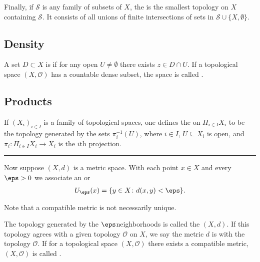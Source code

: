 \documentclass[letterpaper,10pt,english]{jupyterBook}
\begin{document}
\sphinxAtStartPar
Finally, if \(\mathcal{S}\) is any family of subsets of \(X\), the  is the smallest topology on \(X\) containing \(\mathcal{S}\). It consists of all unions of finite intersections of sets in \(\mathcal{S} \cup \{X,\emptyset\}\).


\subsection{Density}
\label{\detokenize{polish:density}}
\sphinxAtStartPar
A set \(D \subset X\) is  if for any open \(U \neq \emptyset\) there exists \(z \in D \cap U\). If a topological space \((X, \mathcal{O})\) has a countable dense subset, the space is called .


\subsection{Products}
\label{\detokenize{polish:products}}
\sphinxAtStartPar
If \((X_i)_{i \in I}\) is a family of topological spaces, one defines the  on \(\Pi_{i \in I} X_i\) to be the topology generated by the sets \(\pi_i^{-1}(U)\), where \(i \in I\), \(U \subseteq X_i\) is open, and \(\pi_i: \Pi_{i \in I} X_i \to X_i\) is the \(i\)th projection.


\bigskip\hrule\bigskip


\sphinxAtStartPar
Now suppose \((X,d)\) is a metric space. With each point \(x \in X\) and every \(\eps > 0\) we associate an  or 
\begin{equation*}
\begin{split}
U_\eps(x) = \{y \in X \colon d(x,y)<\eps\}.
\end{split}
\end{equation*}
\begin{sphinxShadowBox}
\sphinxstylesidebartitle{}

\sphinxAtStartPar
Note that a compatible metric is not necessarily unique.
\end{sphinxShadowBox}

\sphinxAtStartPar
The topology generated by the \(\eps\)\sphinxhyphen{}neighborhoods is called the  \((X,d)\). If this topology agrees with a given topology \(\mathcal{O}\) on \(X\), we say the metric \(d\) is  with the topology \(\mathcal{O}\). If for a topological space \((X, \mathcal{O})\) there exists a compatible metric, \((X, \mathcal{O})\) is called .
\end{document}
